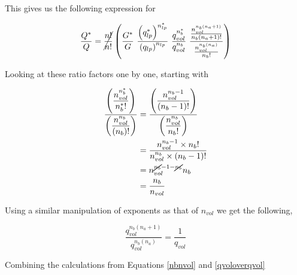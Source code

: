 \documentclass[12pt,letterpaper]{article}
\newcommand{\lr}[1]{\left( #1 \right)}
\begin{document}
This gives us the following expression for     

\begin{equation}
\frac{
        Q^{*}
}{
	    Q
}
=
    \cancel{
    	\frac{
    	    n!
    	}{
    	    n!
    	}
    }
	\left(
	    \frac{
	        G^{*}
	    }{
	        G
	    }
	    ~
	    \frac{
	        \lr{
	            q_{lp}^{*}
	        }
	        ^{
    	        n_{lp}^{*}
    	    }
	    }{
	        \lr{
	            q_{lp}	        
    	    }
    	    ^{
    	        n_{lp}
    	    }
	    }
	    ~
	    \frac{
    	    q_{vol}^{n_{b}^{*}}
    	}{
    	    q_{vol}^{n_{b}}
    	}
    	~
    	\frac{
    		\frac{
    			n_{vol}^{n_{b}(n_a+1)}
    		}{
    			n_b(n_a+1)!
    		}
		}{	
    		\frac{
    			n_{vol}^{n_{b}(n_a)}
    		}{
    			n_b!
    		}
		}
	\right)
	\label{Eq: RatQ}
\end{equation}


Looking at these ratio factors one by one, starting with


\begin{align}
\label{nbnvol}
    \frac{
        \lr{\displaystyle
        		\frac{
        			n_{vol}^{n_{b}^{*}}
        		}{
        			n_b^{*}!
        		}
        }
    }{
        \lr{\displaystyle
        		\frac{
        			n_{vol}^{n_{b}}
        		}{
        		    \lr{
        			    n_b
        		    }!
        		}
        	}
    }\nonumber
    &=
	\frac{
	    \lr{
	        \displaystyle
    		\frac{
    			n_{vol}^{n_{b}-1}
    		}{
    			(n_b-1)!
    		}
		}
	}{
		\lr{
		    \displaystyle	
    		\frac{
    			n_{vol}^{n_{b}}
    		}{
    			n_b!
    		}
    	}	
	}\\
	&=
	\frac{
        n_{vol}^{n_{b}-1} 
    	\times
    	n_b!
    }{
	    n_{vol}^{n_{b}}
		\times
		(n_b-1)!
	}\\
	&=
	n_{vol}^{\cancel{n_{b}}-1-\cancel{n_{b}}} 
	n_b\nonumber\\
	&=
	\frac{
	    n_b
	}{
	    n_{vol} 
	}\nonumber
\end{align}

Using a similar manipulation of exponents as that of $n_{vol}$ we get the following,

\begin{equation}
\frac{
    	    q_{vol}^{n_{b}(n_a+1)}
    	}{
    	    q_{vol}^{n_{b}(n_a)}
}
=
\frac{
    1
}{
    q_{vol}
}
\label{qvoloverqvol}
\end{equation}

Combining the calculations from Equations \ref{nbnvol} and \ref{qvoloverqvol}
\end{document}
